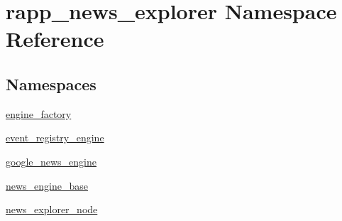 \hypertarget{namespacerapp__news__explorer}{\section{rapp\-\_\-news\-\_\-explorer Namespace Reference}
\label{namespacerapp__news__explorer}
}
\subsection*{Namespaces}
\begin{DoxyCompactItemize}
\item 
\hyperlink{namespacerapp__news__explorer_1_1engine__factory}{engine\-\_\-factory}
\item 
\hyperlink{namespacerapp__news__explorer_1_1event__registry__engine}{event\-\_\-registry\-\_\-engine}
\item 
\hyperlink{namespacerapp__news__explorer_1_1google__news__engine}{google\-\_\-news\-\_\-engine}
\item 
\hyperlink{namespacerapp__news__explorer_1_1news__engine__base}{news\-\_\-engine\-\_\-base}
\item 
\hyperlink{namespacerapp__news__explorer_1_1news__explorer__node}{news\-\_\-explorer\-\_\-node}
\end{DoxyCompactItemize}
